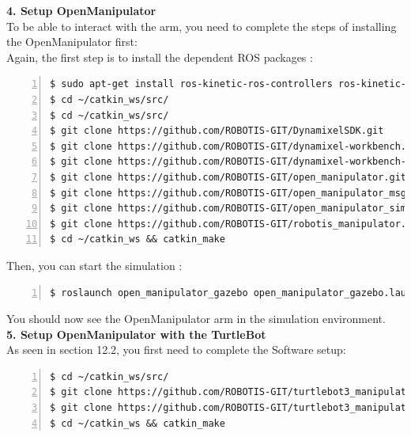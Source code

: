 \documentclass[plainarticle,zihtitle,english,final,hyperref,utf8]{zihpub}
\begin{document}
\textbf{4. Setup OpenManipulator}\\
\newline
To be able to interact with the arm, you need to complete the steps of installing the OpenManipulator first:\\
\newline
Again, the first step is to install the dependent ROS packages \cite{ros1omub}:
\begin{Verbatim}[breaklines=true, breakanywhere=true, baselinestretch=1,fontsize=\scriptsize,numbers=left,frame=single,stepnumber=5,xleftmargin=1cm,xrightmargin=1cm]
$ sudo apt-get install ros-kinetic-ros-controllers ros-kinetic-gazebo* ros-kinetic-moveit* ros-kinetic-industrial-core
$ cd ~/catkin_ws/src/
$ cd ~/catkin_ws/src/
$ git clone https://github.com/ROBOTIS-GIT/DynamixelSDK.git
$ git clone https://github.com/ROBOTIS-GIT/dynamixel-workbench.git
$ git clone https://github.com/ROBOTIS-GIT/dynamixel-workbench-msgs.git
$ git clone https://github.com/ROBOTIS-GIT/open_manipulator.git
$ git clone https://github.com/ROBOTIS-GIT/open_manipulator_msgs.git
$ git clone https://github.com/ROBOTIS-GIT/open_manipulator_simulations.git
$ git clone https://github.com/ROBOTIS-GIT/robotis_manipulator.git
$ cd ~/catkin_ws && catkin_make
\end{Verbatim}

Then, you can start the simulation \cite{ros1omsim}:
\begin{Verbatim}[breaklines=true, breakanywhere=true, baselinestretch=1,fontsize=\scriptsize,numbers=left,frame=single,stepnumber=5,xleftmargin=1cm,xrightmargin=1cm]
$ roslaunch open_manipulator_gazebo open_manipulator_gazebo.launch
    \end{Verbatim}
\label{code:openman}

You should now see the OpenManipulator arm in the simulation environment.\\
\newline
\textbf{5. Setup OpenManipulator with the TurtleBot}\\
\newline
As seen in section 12.2, you first need to complete the Software setup:
\begin{Verbatim}[breaklines=true, breakanywhere=true, baselinestretch=1,fontsize=\scriptsize,numbers=left,frame=single,stepnumber=5,xleftmargin=1cm,xrightmargin=1cm]
$ cd ~/catkin_ws/src/
$ git clone https://github.com/ROBOTIS-GIT/turtlebot3_manipulation.git
$ git clone https://github.com/ROBOTIS-GIT/turtlebot3_manipulation_simulations.git
$ cd ~/catkin_ws && catkin_make
\end{Verbatim}
\end{document}
